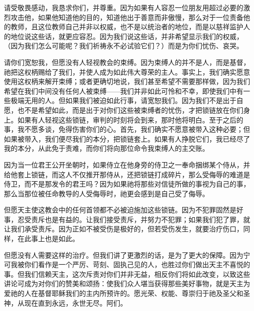 请受敬畏感动，我恳求你们，并尊重。因为如果有人容忍一位朋友用超过必要的激烈攻击他，如果他知道他的目的，知道他出于善意而非傲慢，那么对于一位责备他的教师，且这位教师自己并非以权威，也不是以统治者的地位，而是以慈祥监护人的地位说这些话，就更应容忍。因为我们说这些话，并非希望显示我们的权威，（因为我们怎么可能呢？我们祈祷永不必试验它们？）而是为你们忧伤、哀哭。\par

请你们宽恕我，但愿没有人轻视教会的束缚。因为束缚人的并不是人，而是基督，祂把这权柄赐给了我们，并使人成为如此伟大尊荣的主人。事实上，我们确实愿意使用这权柄来解开束缚；或者更确切地说，我们甚至希望不需要那样做，因为我们希望在我们中间没有任何人被束缚——我们并非如此可怜和不幸，即使我们中有一些极端无用的人。但如果我们被迫如此行事，请宽恕我们。因为我们不是出于自愿，也不是希望如此，而是出于对你们这些被束缚者的忧伤，才把锁链放在你们身上。如果有人轻视这些锁链，审判的时刻将会到来，那时他将明白。至于之后的事，我不愿多谈，免得伤害你们的心。首先，我们确实不愿意被带入这种必要；但如果被带入，我们便尽我们的本分，把锁链套上。如果有人挣脱它们，我已经尽了我的本分，从此免于责难，而你们将向那位命令我束缚人的主交账。\par

因为当一位君王公开坐朝时，如果侍立在他身旁的侍卫之一奉命捆绑某个侍从，并给他套上锁链，而这人不仅推开那侍从，还把锁链打成碎片，那么受侮辱的难道是侍卫，而不是那发令的君王吗？因为如果祂将那些对信徒所做的事视为自己的事，那么当那位被任命教导的人受侮辱时，祂更会感到是自己受了侮辱。\par

但愿天主使这教会中的任何首领都不必被迫施加这些锁链。因为不犯罪固然是好事，忍受责斥也是有益的。让我们接受责斥，并努力不犯罪；如果我们犯了罪，就让我们承受责斥。因为正如不被受伤是极好的，但若受伤发生，就要治疗伤口，同样，在此事上也是如此。\par

但愿没有人需要这样的治疗。但我们讲了更激烈的话，是为了更大的保障。因为宁可我被你们看作是一个严厉、苛刻、固执己见的人，也胜过你们做出天主不喜悦的事。但我们信赖天主，这次斥责对你们并非无益，相反你们将如此改变，以致这些讲论可成为对你们的赞美和颂扬：使我们众人堪当获得那些美好事物，就是天主为爱祂的人在基督耶稣我们的主内所预许的。愿光荣、权能、尊崇归于祂及圣父和圣神，从现在直到永远，永世无尽。阿们。\par


